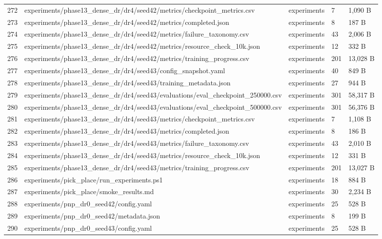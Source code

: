 \documentclass[11pt,a4paper,oneside]{book}
\begin{document}
\begin{longtable}{l l l l l}
272 & experiments/phase13\_dense\_dr/dr4/seed42/metrics/checkpoint\_metrics.csv & experiments & 7 & 1,090 B \\
273 & experiments/phase13\_dense\_dr/dr4/seed42/metrics/completed.json & experiments & 8 & 187 B \\
274 & experiments/phase13\_dense\_dr/dr4/seed42/metrics/failure\_taxonomy.csv & experiments & 43 & 2,006 B \\
275 & experiments/phase13\_dense\_dr/dr4/seed42/metrics/resource\_check\_10k.json & experiments & 12 & 332 B \\
276 & experiments/phase13\_dense\_dr/dr4/seed42/metrics/training\_progress.csv & experiments & 201 & 13,028 B \\
277 & experiments/phase13\_dense\_dr/dr4/seed43/config\_snapshot.yaml & experiments & 40 & 849 B \\
278 & experiments/phase13\_dense\_dr/dr4/seed43/training\_metadata.json & experiments & 27 & 944 B \\
279 & experiments/phase13\_dense\_dr/dr4/seed43/evaluations/eval\_checkpoint\_250000.csv & experiments & 301 & 58,317 B \\
280 & experiments/phase13\_dense\_dr/dr4/seed43/evaluations/eval\_checkpoint\_500000.csv & experiments & 301 & 56,376 B \\
281 & experiments/phase13\_dense\_dr/dr4/seed43/metrics/checkpoint\_metrics.csv & experiments & 7 & 1,108 B \\
282 & experiments/phase13\_dense\_dr/dr4/seed43/metrics/completed.json & experiments & 8 & 186 B \\
283 & experiments/phase13\_dense\_dr/dr4/seed43/metrics/failure\_taxonomy.csv & experiments & 43 & 2,010 B \\
284 & experiments/phase13\_dense\_dr/dr4/seed43/metrics/resource\_check\_10k.json & experiments & 12 & 331 B \\
285 & experiments/phase13\_dense\_dr/dr4/seed43/metrics/training\_progress.csv & experiments & 201 & 13,027 B \\
286 & experiments/pick\_place/run\_experiments.ps1 & experiments & 18 & 884 B \\
287 & experiments/pick\_place/smoke\_results.md & experiments & 30 & 2,234 B \\
288 & experiments/pnp\_dr0\_seed42/config.yaml & experiments & 25 & 528 B \\
289 & experiments/pnp\_dr0\_seed42/metadata.json & experiments & 8 & 199 B \\
290 & experiments/pnp\_dr0\_seed43/config.yaml & experiments & 25 & 528 B \\

\end{longtable}
\end{document}
